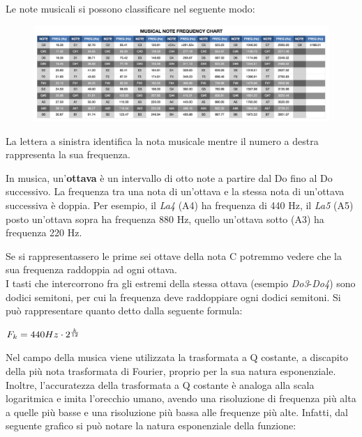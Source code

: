 Le note musicali si possono classificare nel seguente modo:
\begin{figure}[H]
	\centering
	\includegraphics[scale=0.15]{./images/img4.jpg}
\end{figure}
La lettera a sinistra identifica la nota musicale mentre il numero a destra rappresenta la sua frequenza.

In musica, un'\textbf{ottava} è un intervallo di otto note a partire dal Do fino al Do successivo. La frequenza tra una nota di un'ottava e la stessa nota di un'ottava successiva è doppia. Per esempio, il \textit{La4} (A4) ha frequenza di 440 Hz, il \textit{La5} (A5) posto un'ottava sopra ha frequenza 880 Hz, quello un'ottava sotto (A3) ha frequenza 220 Hz.

Se si rappresentassero le prime sei ottave della nota C potremmo vedere che la sua frequenza raddoppia ad ogni ottava. \\
\newline
I tasti che intercorrono fra gli estremi della stessa ottava (esempio \textit{Do3}-\textit{Do4}) sono dodici semitoni, per cui la frequenza deve raddoppiare ogni dodici semitoni. Si può rappresentare quanto detto dalla seguente formula: \\

\begin{center}
	\begin{math}
		F_{k}=440Hz \cdot 2^{k \over 12}
	\end{math}
\end{center}
Nel campo della musica viene utilizzata la trasformata a Q costante, a discapito della più nota trasformata di Fourier, proprio per la sua natura esponenziale. Inoltre, l'accuratezza della trasformata a Q costante è analoga alla scala logaritmica e imita l'orecchio umano, avendo una risoluzione di frequenza più alta a quelle più basse e una risoluzione più bassa alle frequenze più alte. Infatti, dal seguente grafico si può notare la natura esponenziale della funzione:
\begin{center}
\end{center}